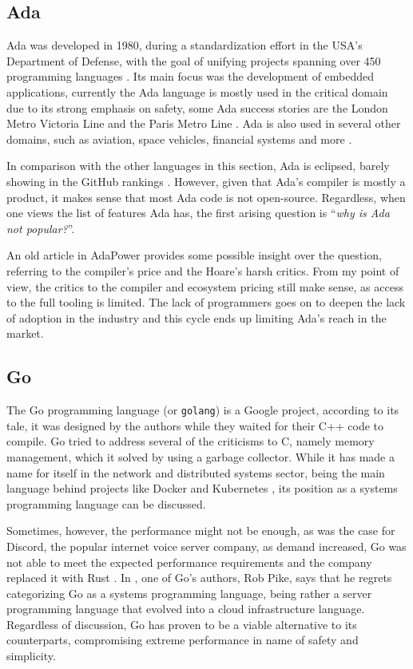 \subsection{Ada}

Ada was developed in 1980, during a standardization effort in the USA's Department of Defense,
with the goal of unifying projects spanning over 450 programming languages \autocite{Ada2021}.
Its main focus was the development of embedded applications,
currently the Ada language is mostly used in the critical domain due to its strong emphasis on safety,
some Ada success stories are the London Metro Victoria Line and the Paris Metro Line \autocite{SIGAda2021}.
Ada is also used in several other domains, such as aviation, space vehicles, financial systems and more \autocite{Feldman2014}.

In comparison with the other languages in this section, Ada is eclipsed, barely showing in the GitHub rankings \autocite{Palmer2021}.
However, given that Ada's compiler is mostly a product, it makes sense that most Ada code is not open-source.
Regardless, when one views the list of features Ada has, the first arising question is “\emph{why is Ada not popular?}”.

An old article in AdaPower \autocite{Heaney1998} provides some possible insight over the question,
referring to the compiler's price and the Hoare's harsh critics.
From my point of view, the critics to the compiler and ecosystem pricing still make sense,
as access to the full tooling is limited.
The lack of programmers goes on to deepen the lack of adoption in the industry
and this cycle ends up limiting Ada's reach in the market.

\subsection{Go}

The Go programming language (or \texttt{golang}) is a Google project,
according to its tale, it was designed by the authors while they waited for their C++ code to compile.
Go tried to address several of the criticisms to C, namely memory management,
which it solved by using a garbage collector.
While it has made a name for itself in the network and distributed systems sector,
being the main language behind projects like Docker \autocite{Docker2021} and Kubernetes \autocite{Kubernetes2021},
its position as a systems programming language can be discussed.

Sometimes, however, the performance might not be enough,
as was the case for Discord, the popular internet voice server company, as demand increased,
Go was not able to meet the expected performance requirements and the company replaced it with Rust \autocite{Howarth2020}.
In \autocite{Torre2014}, one of Go's authors, Rob Pike, says that he regrets categorizing Go as a systems programming language,
being rather a server programming language that evolved into a cloud infrastructure language.
Regardless of discussion, Go has proven to be a viable alternative to its counterparts,
compromising extreme performance in name of safety and simplicity.

